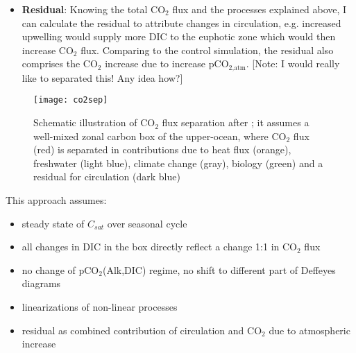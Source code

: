 \begin{itemize}
\item \textbf{Residual}: Knowing the total CO$_2$ flux and the processes explained above, I can calculate the residual to attribute changes in circulation, e.g. increased upwelling would supply more DIC to the euphotic zone which would then increase CO$_2$ flux. Comparing to the control simulation, the residual also comprises the CO$_2$ increase due to increase pCO$_{\text{2,atm}}$. [Note: I would really like to separated this! Any idea how?]

\end{itemize}





\begin{figure}[h!]
	\centering
	\texttt{[image: co2sep]}
	\caption{Schematic illustration of CO$_2$ flux separation after \citep{Lauderdale2016a}; it assumes a well-mixed zonal carbon box of the upper-ocean, where CO$_2$ flux (red) is separated in contributions due to heat flux (orange), freshwater (light blue), climate change (gray), biology (green) and a residual for circulation (dark blue)}	
	\label{fig:CO2flux_separation}
\end{figure}

\vspace{1cm}

This approach assumes: \nopagebreak
\begin{itemize}

\item steady state of $C_{sat}$ over seasonal cycle \citep{Lauderdale2016a}
\item all changes in DIC in the box directly reflect a change 1:1 in CO$_2$ flux
\item no change of pCO$_2$(Alk,DIC) regime, no shift to different part of Deffeyes diagrams
\item linearizations of non-linear processes
\item residual as combined contribution of circulation and CO$_2$ due to atmospheric increase

\end{itemize}










